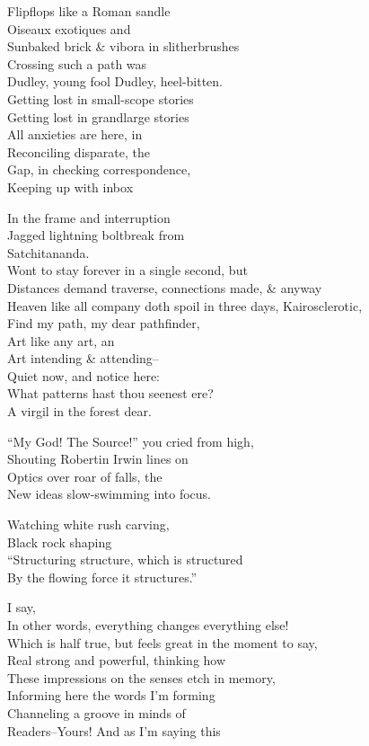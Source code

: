 Flipflops like a Roman sandle \\
Oiseaux exotiques and \\
Sunbaked brick \& vibora in slitherbrushes \\
Crossing such a path was \\
Dudley, young fool Dudley, heel-bitten. \\

Getting lost in small-scope stories \\
Getting lost in grandlarge stories \\
All anxieties are here, in \\
Reconciling disparate, the \\ 
Gap, in checking correspondence, \\
Keeping up with inbox 

In the frame and interruption \\
Jagged lightning boltbreak from \\
Satchitananda. \\
Wont to stay forever in a single second, but \\
Distances demand traverse, connections made, \& anyway \\
Heaven like all company doth spoil in three days,
Kairosclerotic, \\
Find my path, my dear pathfinder, \\
Art like any art, an \\
Art intending \& attending-- \\
Quiet now, and notice here: \\
What patterns hast thou seenest ere? \\
A virgil in the forest dear.

``My God! The Source!'' you cried from high, \\
Shouting Robertin Irwin lines on \\
Optics over roar of falls, the \\
New ideas slow-swimming into focus.

Watching white rush carving, \\
Black rock shaping \\
``Structuring structure, which is structured \\
By the flowing force it structures.''

I say, \\
In other words, everything changes everything else! \\
Which is half true, but feels great in the moment to say, \\
Real strong and powerful, thinking how \\
These impressions on the senses etch in memory, \\
Informing here the words I'm forming \\
Channeling a groove in minds of \\
Readers--Yours! And as I'm saying this

